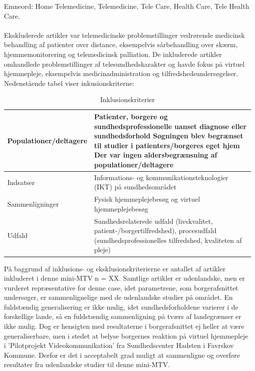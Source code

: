 Emneord: Home Telemedicine, Telemedicine, Tele Care, Health Care, Tele Health Care.\\ \\
Ekskluderede artikler var telemedicinske problemstillinger vedrørende medicinsk behandling af patienter over distance, eksempelvis sårbehandling over skærm, hjemmemonitorering og telemedicinsk palliation. De inkluderede artikler omhandlede problemstillinger af telesundhedskarakter og havde fokus på virtuel hjemmepleje, eksempelvis medicinadministration og tilfredshedsundersøgelser. 
Nedenstående tabel viser inkusionskriterne:
\begin{table}[H]
\caption{Inklusionskriterier}
\label{tab:inklusionstabel}
\centering
\begin{tabularx}{\textwidth}{lX}
\hline
Populationer/deltagere & Patienter, borgere og sundhedsprofessionelle uanset diagnose eller sundhedsforhold
Søgningen blev begrænset til studier i patienters/borgeres eget hjem
Der var ingen aldersbegrænsning af populationer/deltagere\\ \hline
Indsatser             & Informations- og kommunikationsteknologier (IKT) på sundhedsområdet        \\ \hline
Sammenligninger             & Fysisk hjemmeplejebesøg og virtuel hjemmeplejebesøg          \\ \hline
Udfald             & Sundhedsrelaterede udfald (livskvalitet, patient-/borgertilfredshed), procesudfald (sundhedsprofessionelles tilfredshed, kvaliteten af pleje)          \\ \hline
\end{tabularx}
\end{table}

På baggrund af inklusions- og eksklusionskriterierne er antallet af artikler inkluderet i denne mini-MTV n = XX. Samtlige artikler er udenlandske, men er vurderet repræsentative for denne case, idet parametrene, som borgerafsnittet undersøger, er sammenlignelige med de udenlandske studier på området. En fuldstændig generalisering er ikke mulig, idet sundhedsforholdene varierer i de forskellige lande, så en fuldstændig sammenligning på tværs af landegrænser er ikke mulig. Dog er hensigten med resultaterne i borgerafsnittet ej heller at være generaliserbare, men i stedet at belyse borgernes reaktion på virtuel hjemmepleje i ’Pilotprojekt Videokommunikation’ fra Sundhedscenter Hadsten i Favrskov Kommune. Derfor er det i acceptabelt grad muligt at sammenligne og overføre resultater fra udenlandske studier til denne mini-MTV.

